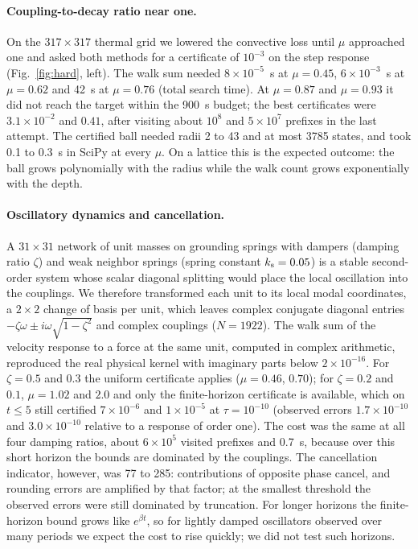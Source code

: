 \documentclass[aps,pra,superscriptaddress,floatfix,longbibliography,twocolumn]{revtex4-2}
\begin{document}
\paragraph*{Coupling-to-decay ratio near one.} On the $317\times317$ thermal grid we lowered the convective loss until $\mu$ approached one and asked both methods for a certificate of $10^{-3}$ on the step response (Fig.~\ref{fig:hard}, left). The walk sum needed $8\times10^{-5}$~s at $\mu=0.45$, $6\times10^{-3}$~s at $\mu=0.62$ and 42~s at $\mu=0.76$ (total search time). At $\mu=0.87$ and $\mu=0.93$ it did not reach the target within the 900~s budget; the best certificates were $3.1\times10^{-2}$ and $0.41$, after visiting about $10^8$ and $5\times10^7$ prefixes in the last attempt. The certified ball needed radii 2 to 43 and at most 3785 states, and took 0.1 to 0.3~s in SciPy at every $\mu$. On a lattice this is the expected outcome: the ball grows polynomially with the radius while the walk count grows exponentially with the depth.

\paragraph*{Oscillatory dynamics and cancellation.} A $31\times31$ network of unit masses on grounding springs with dampers (damping ratio $\zeta$) and weak neighbor springs (spring constant $k_{\rm s}=0.05$) is a stable second-order system whose scalar diagonal splitting would place the local oscillation into the couplings. We therefore transformed each unit to its local modal coordinates, a $2\times2$ change of basis per unit, which leaves complex conjugate diagonal entries $-\zeta\omega\pm i\omega\sqrt{1-\zeta^2}$ and complex couplings ($N=1922$). The walk sum of the velocity response to a force at the same unit, computed in complex arithmetic, reproduced the real physical kernel with imaginary parts below $2\times10^{-16}$. For $\zeta=0.5$ and $0.3$ the uniform certificate applies ($\mu=0.46$, $0.70$); for $\zeta=0.2$ and $0.1$, $\mu=1.02$ and $2.0$ and only the finite-horizon certificate is available, which on $t\le5$ still certified $7\times10^{-6}$ and $1\times10^{-5}$ at $\tau=10^{-10}$ (observed errors $1.7\times10^{-10}$ and $3.0\times10^{-10}$ relative to a response of order one). The cost was the same at all four damping ratios, about $6\times10^5$ visited prefixes and 0.7~s, because over this short horizon the bounds are dominated by the couplings. The cancellation indicator, however, was 77 to 285: contributions of opposite phase cancel, and rounding errors are amplified by that factor; at the smallest threshold the observed errors were still dominated by truncation. For longer horizons the finite-horizon bound grows like $e^{\beta t}$, so for lightly damped oscillators observed over many periods we expect the cost to rise quickly; we did not test such horizons.
\end{document}
